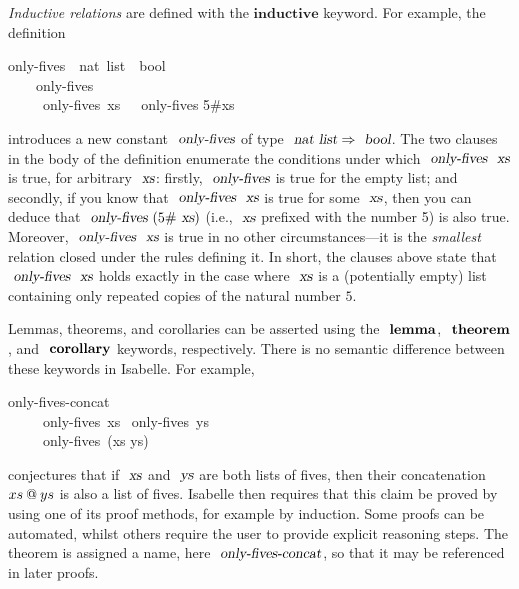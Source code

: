\documentclass[11pt]{article}
\begin{document}
\emph{Inductive relations} are defined with the $\mathbf{inductive}$ keyword.
For example, the definition
\begin{isabelle}
 only-fives\ {\isacharcolon}{\isacharcolon}\ {\isachardoublequoteopen}nat\ list\ {\isasymRightarrow}\ bool{\isachardoublequoteclose}\  \\
~~~~{\isachardoublequoteopen}only-fives\ {\isacharbrackleft}{\isacharbrackright}{\isachardoublequoteclose}\ {\isacharbar}\\
~~~~{\isachardoublequoteopen}{\isasymlbrakk}\ only-fives\ xs\ {\isasymrbrakk}\ {\isasymLongrightarrow}\ only-fives {\isacharparenleft}5\#xs{\isacharparenright}{\isachardoublequoteclose}
\end{isabelle}
\noindent %
introduces a new constant $\isa{only-fives}$ of type $\isa{nat list} \Rightarrow \isa{bool}$.
The two clauses in the body of the definition enumerate the conditions under which $\isa{only-fives}\ \isa{xs}$ is true, for arbitrary $\isa{xs}$: firstly, $\isa{only-fives}$ is true for the empty list; and secondly, if you know that $\isa{only-fives}\ \isa{xs}$ is true for some $\isa{xs}$, then you can deduce that $\isa{only-fives}\ (5\#\isa{xs})$ (i.e., $\isa{xs}$ prefixed with the number 5) is also true.
Moreover, $\isa{only-fives}\ \isa{xs}$ is true in no other circumstances---it is the \emph{smallest} relation closed under the rules defining it.
In short, the clauses above state that $\isa{only-fives}\ \isa{xs}$ holds exactly in the case where $\isa{xs}$ is a (potentially empty) list containing only repeated copies of the natural number $5$.

Lemmas, theorems, and corollaries can be asserted using the $\isacommand{lemma}$, $\isacommand{theorem}$, and $\isacommand{corollary}$ keywords, respectively.
There is no semantic difference between these keywords in Isabelle.
For example,
\begin{isabelle}
 only-fives-concat{\isacharcolon} \\
~~~~\ only-fives\ xs \ only-fives\ ys\\
~~~~\ only-fives\ (xs \isacharat ys)
\end{isabelle}
\noindent %
conjectures that if $\isa{xs}$ and $\isa{ys}$ are both lists of fives, then their concatenation $xs \mathbin{\emph{$@$}} ys$ is also a list of fives.
Isabelle then requires that this claim be proved by using one of its proof methods, for example by induction.
Some proofs can be automated, whilst others require the user to provide explicit reasoning steps.
The theorem is assigned a name, here $\isa{only-fives-concat}$, so that it may be referenced in later proofs.

\newpage





\end{document}
